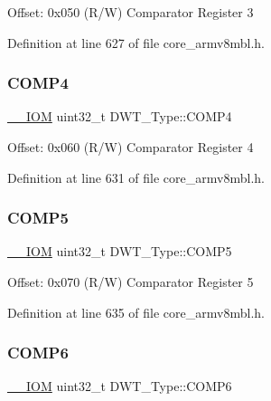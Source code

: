 Offset\+: 0x050 (R/W) Comparator Register 3 

Definition at line 627 of file core\+\_\+armv8mbl.\+h.

\mbox{\label{struct_d_w_t___type_a86bc7f4ad425a05b29978a6f97563783}} 
\subsubsection{\texorpdfstring{C\+O\+M\+P4}{COMP4}}
{\footnotesize\ttfamily \hyperlink{core__sc300_8h_ab6caba5853a60a17e8e04499b52bf691}{\+\_\+\+\_\+\+I\+OM} uint32\+\_\+t D\+W\+T\+\_\+\+Type\+::\+C\+O\+M\+P4}

Offset\+: 0x060 (R/W) Comparator Register 4 

Definition at line 631 of file core\+\_\+armv8mbl.\+h.

\mbox{\label{struct_d_w_t___type_a07667ec9dd833ecab52bf2cf802d9acb}} 
\subsubsection{\texorpdfstring{C\+O\+M\+P5}{COMP5}}
{\footnotesize\ttfamily \hyperlink{core__sc300_8h_ab6caba5853a60a17e8e04499b52bf691}{\+\_\+\+\_\+\+I\+OM} uint32\+\_\+t D\+W\+T\+\_\+\+Type\+::\+C\+O\+M\+P5}

Offset\+: 0x070 (R/W) Comparator Register 5 

Definition at line 635 of file core\+\_\+armv8mbl.\+h.

\mbox{\label{struct_d_w_t___type_a1256ac92acb94add255ff31aca31070d}} 
\subsubsection{\texorpdfstring{C\+O\+M\+P6}{COMP6}}
{\footnotesize\ttfamily \hyperlink{core__sc300_8h_ab6caba5853a60a17e8e04499b52bf691}{\+\_\+\+\_\+\+I\+OM} uint32\+\_\+t D\+W\+T\+\_\+\+Type\+::\+C\+O\+M\+P6}

